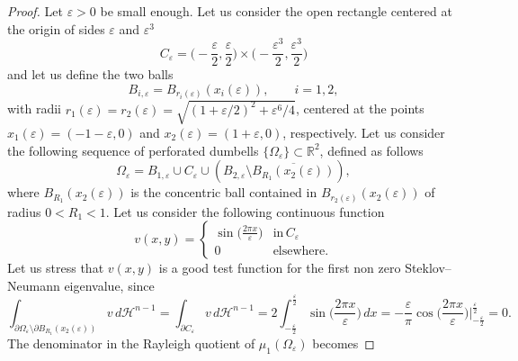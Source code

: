 \documentclass[12pt,reqno]{amsart}
\numberwithin{equation}{section}
\numberwithin{theorem}{section}
\numberwithin{equation}{section}
\numberwithin{theorem}{section}
\begin{document}
\begin{proof}
Let $\varepsilon>0$ be small enough. Let us consider  the open  rectangle centered at the origin of sides $\varepsilon$ and $\varepsilon^3$ 
\begin{equation*}
C_{\varepsilon}= \bigg(-\frac{\varepsilon}{2},\frac{\varepsilon}{2}\bigg)\times \bigg(-\frac{\varepsilon^3}{2},\frac{\varepsilon^3}{2}\bigg)
\end{equation*}
 and let us define  the two balls
\begin{equation*}
    B_{i,\varepsilon}=B_{r_i(\varepsilon)}(x_i(\varepsilon)),  \qquad i=1,2,
\end{equation*}
with radii $r_1(\varepsilon)=r_2(\varepsilon)= \sqrt{(1+\varepsilon/2)^2+\varepsilon^6/4}$, centered at the points $x_1(\varepsilon)=(-1-\varepsilon,0)$ and $x_2(\varepsilon)= (1+\varepsilon,0)$, respectively.
Let us consider the following sequence of perforated dumbells $\{\Omega_\varepsilon\}\subset \mathbb{R}^2 $, defined as follows
\begin{equation*}
	\Omega_\varepsilon = B_{1,\varepsilon}\cup C_{\varepsilon}\cup (B_{2,\varepsilon}\setminus \overline{B_{R_1}(x_2(\varepsilon))}),
\end{equation*}
where $B_{R_1}(x_2(\varepsilon))$ is the concentric ball contained in $B_{r_2(\varepsilon)}(x_2(\varepsilon))$ of radius $0<R_1<1$. Let us consider the following continuous function
\begin{equation*}
	v(x,y)= \begin{cases}
	\sin \bigg(\displaystyle\frac{2\pi x}{\varepsilon}\bigg) & \text{in} \, C_{\varepsilon}\\
	0 & \text{elsewhere}.
	\end{cases}
\end{equation*}
Let us stress that $v(x,y)$ is a good test function for the first non zero Steklov--Neumann eigenvalue, since
\begin{equation*}
    \int_{\partial \Omega_\varepsilon\setminus \partial B_{R_1}(x_2(\varepsilon))}v\,d\mathcal{H}^{n-1}  = \int_{\partial C_\varepsilon}v\,d\mathcal{H}^{n-1} = 2\int_{-\frac{\varepsilon}{2}}^{\frac{\varepsilon}{2}}\sin\bigg(\displaystyle\frac{2\pi x}{\varepsilon}\bigg)\,dx = -\frac{\varepsilon}{\pi}\cos \bigg(\displaystyle\frac{2\pi x}{\varepsilon}\bigg)\Bigg|_{-\frac{\varepsilon}{2}}^{\frac{\varepsilon}{2}}=0.
\end{equation*}
The denominator in the Rayleigh quotient of $\mu_1(\Omega_\varepsilon)$ becomes


\end{proof}
\end{document}
